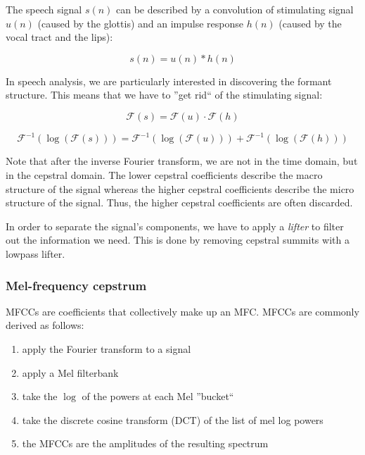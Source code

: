\documentclass[11pt]{article}
\begin{document}
The speech signal $s(n)$ can be described by a convolution of stimulating signal $u(n)$ (caused by the glottis) and an impulse response $h(n)$ (caused by the vocal tract and the lips):

\begin{equation}
    s(n) = u(n) \ast h(n)
\end{equation}

In speech analysis, we are particularly interested in discovering the formant structure. This means that we have to ''get rid`` of the stimulating signal:

\begin{equation}
    \mathcal{F}(s) = \mathcal{F}(u) \cdot \mathcal{F}(h)
\end{equation}

\begin{equation}
    \mathcal{F}^{-1}(\log(\mathcal{F}(s))) = \mathcal{F}^{-1}(\log(\mathcal{F}(u))) + \mathcal{F}^{-1}(\log(\mathcal{F}(h)))
\end{equation}

Note that after the inverse Fourier transform, we are not in the time domain, but in the cepstral domain. The lower cepstral coefficients describe the macro structure of the signal whereas the higher cepstral coefficients describe the micro structure of the signal. Thus, the higher cepstral coefficients are often discarded.

In order to separate the signal's components, we have to apply a \textit{lifter} to filter out the information we need. This is done by removing cepstral summits with a lowpass lifter.

\subsubsection{Mel-frequency cepstrum}

MFCCs are coefficients that collectively make up an MFC. MFCCs are commonly derived as follows:

\begin{enumerate}
    \item apply the Fourier transform to a signal
    \item apply a Mel filterbank
    \item take the $\log$ of the powers at each Mel ''bucket``
    \item take the discrete cosine transform (DCT) of the list of mel log powers
    \item the MFCCs are the amplitudes of the resulting spectrum
\end{enumerate}
\end{document}
